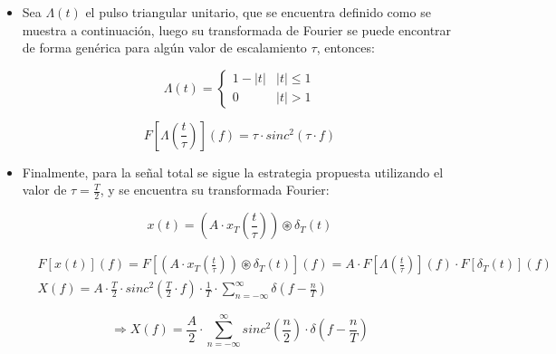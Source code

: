 \begin{itemize}
    \item Sea $\Lambda(t)$ el pulso triangular unitario, que se encuentra definido como se muestra a continuaci\'on, luego su transformada de Fourier se puede encontrar de forma gen\'erica para alg\'un valor de escalamiento $\tau$,
    entonces:

    \begin{equation}
        \Lambda(t) = \begin{cases}
            1 - |t| & |t| \leq 1 \\
            0 & |t| > 1
        \end{cases}
        \label{eq:definicion_pulso_triangular}
    \end{equation}

    \begin{equation}
        F \left[ \Lambda(\frac{t}{\tau}) \right] (f) = 
        \tau \cdot sinc^{2}(\tau \cdot f)
        \label{eq:transformada_pulso_triangular}
    \end{equation}

    \item Finalmente, para la se\~nal total se sigue la estrategia propuesta utilizando el valor de $\tau = \frac{T}{2}$, y se encuentra su transformada Fourier:

    \begin{equation}
        x(t) = \left( A \cdot x_T(\frac{t}{\tau}) \right) \circledast \delta_T(t)
        \label{eq:definicion_tren_triangular}
    \end{equation}

    \begin{align*}
        & F \left[ x(t) \right](f) = F \left[ \left(A \cdot x_T(\frac{t}{\tau}) \right) \circledast \delta_T(t) \right](f) = A \cdot F \left[ \Lambda(\frac{t}{\tau}) \right] (f) \cdot F \left[ \delta_T(t) \right](f) \\
        & X(f) = A \cdot \frac{T}{2} \cdot sinc^{2}(\frac{T}{2} \cdot f) \cdot \frac{1}{T} \cdot \sum_{n = - \infty} ^{\infty} \delta(f - \frac{n}{T})
    \end{align*}

    \begin{equation}
        \Rightarrow X(f) = \frac{A}{2} \cdot \sum_{n = - \infty}^{\infty} sinc^{2}(\frac{n}{2}) \cdot \delta (f - \frac{n}{T})
        \label{eq:transformada_tren_triangular}
    \end{equation}
\end{itemize}


